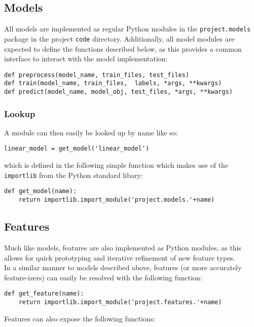 \documentclass[
10pt, %
a4paper, %
oneside, %
headinclude,footinclude, %
BCOR5mm, %
]{scrartcl}
\begin{document}
\subsection{Models}

All models are implemented as regular Python modules in the
\texttt{project.models} package in the project \texttt{code} directory.
Additionally, all model modules are expected to define the functions described
below, as this provides a common interface to interact with the model
implementation: 
\begin{Verbatim}[frame=single]
def preprocess(model_name, train_files, test_files)
def train(model_name, train_files,  labels, *args, **kwargs)
def predict(model_name, model_obj, test_files, *args, **kwargs)
\end{Verbatim}

\subsubsection{Lookup}
\noindent A module can then easily be looked up by name like so:
\begin{Verbatim}[frame=single]
linear_model = get_model('linear_model')
\end{Verbatim}
\noindent which is defined in the following simple function which makes use
of the \texttt{importlib} from the Python standard libary:
\begin{Verbatim}[frame=single]
def get_model(name):
    return importlib.import_module('project.models.'+name)
\end{Verbatim}

\subsection{Features}

\noindent Much like models, features are also implemented as Python modules, as
this allows for quick prototyping and iterative refinement of new feature types.
\\

\noindent In a similar manner to models described above, features (or more
accurately feature-izers) can easily be resolved with the following function:

\begin{Verbatim}[frame=single]
def get_feature(name):
    return importlib.import_module('project.features.'+name)
\end{Verbatim}

\noindent Features can also expose the following functions:
\end{document}
